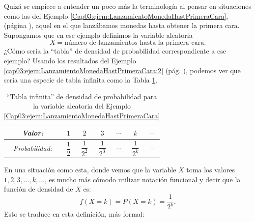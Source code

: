 Quizá se empiece a entender un poco más la terminología al pensar en situaciones como las del Ejemplo \ref{Cap03:ejem:LanzamientoMonedaHastPrimeraCara}, (página \pageref{Cap03:ejem:LanzamientoMonedaHastPrimeraCara}), aquel  en el que lanzábamos monedas hasta obtener la primera cara. Supongamos que en ese ejemplo definimos la variable aleatoria
\[X=\mbox{número de lanzamientos hasta la primera cara.}\]
¿Cómo sería la ``tabla'' de densidad de probabilidad correspondiente a ese ejemplo? Usando los resultados del Ejemplo \ref{cap03:ejem:LanzamientoMonedaHastPrimeraCara:2} (pág. \pageref{cap03:ejem:LanzamientoMonedaHastPrimeraCara:2}), podemos ver que sería una especie de tabla infinita como la Tabla \ref{cap04:tabla:tablaDensidadProbabilidadInfinita}.
    \begin{table}[h!]
    \begin{center}
    \begin{tabular}[t]{|c|c|c|c|c|c|c}
    \hline
    \rule{0cm}{0.5cm}{\em Valor:}&$1$&$2$&$3$&$\cdots$&$k$&$\cdots$\\
    \hline
    \rule{0cm}{0.7cm}{\em Probabilidad:}&$\dfrac{1}{2}$&$\dfrac{1}{2^2}$&$\dfrac{1}{2^3}$&$\cdots$&$\dfrac{1}{2^k}$&$\cdots$\\[4mm]
    \hline
    \end{tabular}
    \end{center}
    \caption{``Tabla infinita'' de densidad de probabilidad para la variable aleatoria del Ejemplo \ref{Cap03:ejem:LanzamientoMonedaHastPrimeraCara}}\label{cap04:tabla:tablaDensidadProbabilidadInfinita}
    \end{table}
En una situación como esta, donde vemos que la variable $X$ toma los valores $1,2,3,\ldots,k,\ldots$, es mucho más cómodo utilizar notación funcional y decir que la función de densidad de $X$ es:
\[f(X=k)=P(X=k)=\dfrac{1}{2^k}.\]
Esto se traduce en esta definición, más formal:
    \begin{center}
    \end{center}
